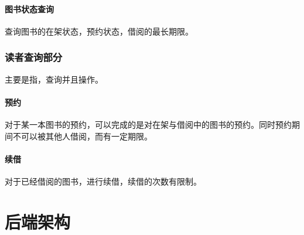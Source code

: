 \documentclass[UTF8]{report}
\begin{document}
    \subsection{图书状态查询}
    查询图书的在架状态，预约状态，借阅的最长期限。
    \section{读者查询部分}
    主要是指，查询并且操作。
    \subsection{预约}
    对于某一本图书的预约，可以完成的是对在架与借阅中的图书的预约。同时预约期间不可以被其他人借阅，而有一定期限。
    \subsection{续借}
    对于已经借阅的图书，进行续借，续借的次数有限制。
    \part{后端架构}
    \setcounter{chapter}{0}
\end{document}
